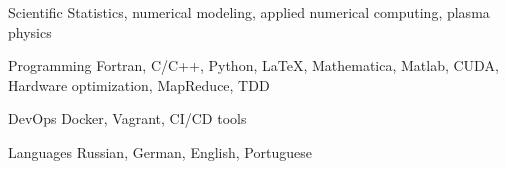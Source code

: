 \begin{cvskills}

    \cvskill
      {Scientific} %
      {Statistics, numerical modeling, applied numerical computing, plasma physics} %

    \cvskill
      {Programming} %
      {Fortran, C/C++, Python, LaTeX, Mathematica, Matlab, CUDA, Hardware optimization, MapReduce, TDD} %

    \cvskill
      {DevOps} %
      {Docker, Vagrant, CI/CD tools} %

    \cvskill
      {Languages} %
      {Russian, German, English, Portuguese} %

\end{cvskills}
